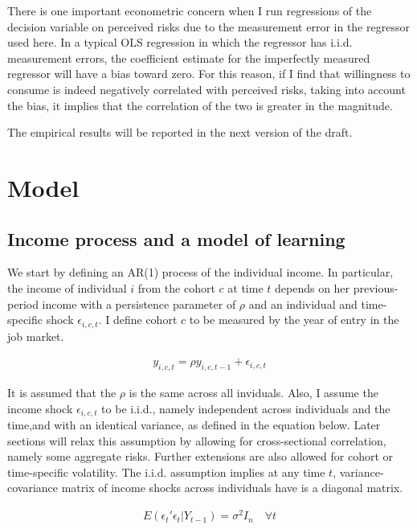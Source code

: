 \documentclass[12pt,notitlepage,onecolumn,aps,pra]{article}
\begin{document}
There is one important econometric concern when I run regressions of the
decision variable on perceived risks due to the measurement error in the
regressor used here. In a typical OLS regression in which the regressor
has i.i.d. measurement errors, the coefficient estimate for the
imperfectly measured regressor will have a bias toward zero. For this
reason, if I find that willingness to consume is indeed negatively
correlated with perceived risks, taking into account the bias, it
implies that the correlation of the two is greater in the magnitude.

The empirical results will be reported in the next version of the draft.



    \hypertarget{model}{%
\section{Model}\label{model}}

\hypertarget{income-process-and-a-model-of-learning}{%
\subsection{Income process and a model of
learning}\label{income-process-and-a-model-of-learning}}

We start by defining an AR(1) process of the individual income. In
particular, the income of individual \(i\) from the cohort \(c\) at time
\(t\) depends on her previous-period income with a persistence parameter
of \(\rho\) and an individual and time-specific shock
\(\epsilon_{i,c,t}\). I define cohort \(c\) to be measured by the year
of entry in the job market.

\begin{eqnarray}
y_{i,c,t} = \rho y_{i,c,t-1} + \epsilon_{i,c,t}
\end{eqnarray}

It is assumed that the \(\rho\) is the same across all inviduals. Also,
I assume the income shock \(\epsilon_{i,c,t}\) to be i.i.d., namely
independent across individuals and the time,and with an identical
variance, as defined in the equation below. Later sections will relax
this assumption by allowing for cross-sectional correlation, namely some
aggregate risks. Further extensions are also allowed for cohort or
time-specific volatility. The i.i.d. assumption implies at any time
\(t\), variance-covariance matrix of income shocks across individuals
have is a diagonal matrix.

\begin{eqnarray}
E(\epsilon_{t}'\epsilon_{t}|Y_{t-1}) = \sigma^2 I_n \quad \forall t 
\end{eqnarray}
\end{document}
